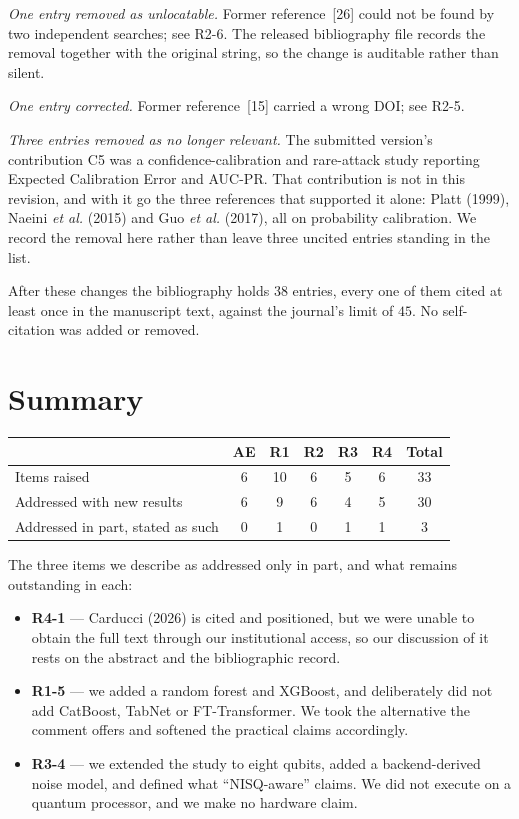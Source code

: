 \documentclass[11pt,a4paper]{article}
\begin{document}
\emph{One entry removed as unlocatable.} Former reference~[26] could not be
found by two independent searches; see R2-6. The released bibliography file
records the removal together with the original string, so the change is
auditable rather than silent.

\emph{One entry corrected.} Former reference~[15] carried a wrong DOI; see R2-5.

\emph{Three entries removed as no longer relevant.} The submitted version's
contribution C5 was a confidence-calibration and rare-attack study reporting
Expected Calibration Error and AUC-PR. That contribution is not in this
revision, and with it go the three references that supported it alone: Platt
(1999), Naeini \emph{et al.} (2015) and Guo \emph{et al.} (2017), all on
probability calibration. We record the removal here rather than leave three
uncited entries standing in the list.

After these changes the bibliography holds $38$ entries, every one of them cited
at least once in the manuscript text, against the journal's limit of $45$. No
self-citation was added or removed.

\section{Summary}

\begin{center}
\small
\begin{tabular}{@{}lcccccc@{}}
\toprule
& AE & R1 & R2 & R3 & R4 & Total \\
\midrule
Items raised                  & 6 & 10 & 6 & 5 & 6 & 33 \\
Addressed with new results    & 6 &  9 & 6 & 4 & 5 & 30 \\
Addressed in part, stated as such & 0 & 1 & 0 & 1 & 1 & 3 \\
\bottomrule
\end{tabular}
\end{center}

\vspace{4pt}
The three items we describe as addressed only in part, and what remains
outstanding in each:

\begin{itemize}[leftmargin=1.3em,itemsep=2pt,topsep=3pt]
  \item \textbf{R4-1} --- Carducci (2026) is cited and positioned, but we were
    unable to obtain the full text through our institutional access, so our
    discussion of it rests on the abstract and the bibliographic record.
  \item \textbf{R1-5} --- we added a random forest and XGBoost, and deliberately
    did not add CatBoost, TabNet or FT-Transformer. We took the alternative the
    comment offers and softened the practical claims accordingly.
  \item \textbf{R3-4} --- we extended the study to eight qubits, added a
    backend-derived noise model, and defined what ``NISQ-aware'' claims. We did
    not execute on a quantum processor, and we make no hardware claim.
\end{itemize}
\end{document}

